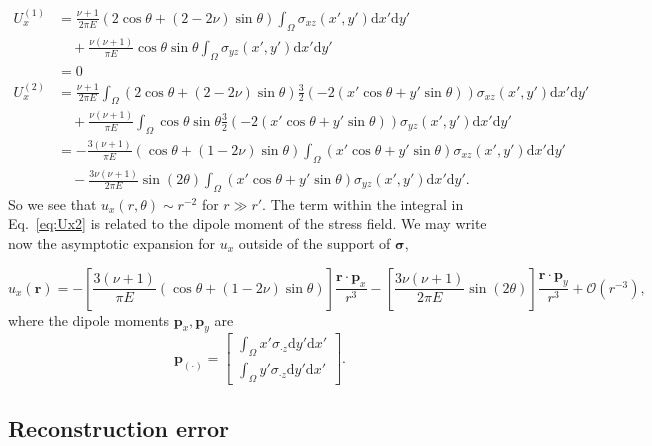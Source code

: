 \documentclass{article}
\newcommand{\dd}{\mathrm{d}}
\newcommand{\br}{\mathbf{r}}
\newcommand{\bp}{\mathbf{p}}
\begin{document}
\begin{align}
U_x^{(1)} &= \frac{\nu+1}{2\pi E} (2\cos\theta + (2-2\nu)\sin\theta) \int_\Omega \sigma_{xz}(x',y')\dd x' \dd y' \nonumber\\
&\quad+\frac{\nu(\nu+1)}{\pi E}\cos\theta\sin\theta \int_\Omega \sigma_{yz}(x',y')\dd x' \dd y' \nonumber \\
&=0 \\
U_x^{(2)} &=  \frac{\nu+1}{2\pi E}\int_\Omega (2\cos\theta + (2-2\nu)\sin\theta)\frac{3}{2}(-2(x'\cos\theta+y'\sin\theta)) \sigma_{xz}(x',y') \dd x' \dd y' \nonumber \\
&\quad+\frac{\nu(\nu+1)}{\pi E} \int_\Omega \cos\theta\sin\theta\frac{3}{2}(-2(x'\cos\theta+y'\sin\theta)) \sigma_{yz}(x',y') \dd x' \dd y' \nonumber \\
&=-\frac{3(\nu+1)}{\pi E}(\cos\theta + (1-2\nu)\sin\theta) \int_{\Omega} (x'\cos\theta + y'\sin\theta ) \sigma_{xz}(x',y') \dd x' \dd y' \nonumber \\ 
&\quad - \frac{3\nu(\nu+1)}{2\pi E}\sin(2\theta) \int_\Omega(x'\cos\theta + y'\sin\theta ) \sigma_{yz}(x',y') \dd x' \dd y' .\label{eq:Ux2}
\end{align}
So we see that $u_x(r,\theta)\sim r^{-2}$ for $r\gg r'$. The term within the integral in Eq.~\ref{eq:Ux2} is related to the dipole moment of the stress field. We may write now the asymptotic expansion for $u_x$ outside of the support of $\boldsymbol\sigma$,

\begin{equation}
u_x(\br)  = -\left[ \frac{3(\nu+1)}{\pi E}(\cos\theta + (1-2\nu)\sin\theta) \right] \frac{\br\cdot \bp_x}{r^3} -\left[ \frac{3\nu(\nu+1)}{2\pi E}\sin(2\theta)  \right] \frac{\br\cdot \bp_y}{r^3} + \mathcal{O}(r^{-3}),
\end{equation}
%
where the dipole moments $\bp_x,\bp_y$ are
%
\begin{equation}
\bp_{(\cdot)}  = \left[ \begin{matrix} \displaystyle\int_{\Omega} x' \sigma_{\cdot z} \dd y' \dd x' \\ \displaystyle\int_{\Omega} y' \sigma_{\cdot z} \dd y' \dd x'  \end{matrix} \right].
\end{equation}



\subsection{Reconstruction error}
\end{document}
